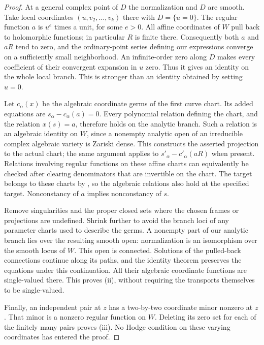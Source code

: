 \begin{proof}
At a general complex point of $D$ the normalization and $D$ are smooth.
Take local coordinates $(u,v_2,\ldots,v_k)$ there with $D=\{u=0\}$.
The regular function $a$ is $u^e$ times a unit, for some $e>0$.
All affine coordinates of $W$ pull back to holomorphic functions; in
particular $R$ is finite there.  Consequently both $a$ and $aR$ tend to
zero, and the ordinary-point series defining our expressions converge
on a sufficiently small neighborhood.  An infinite-order zero along
$D$ makes every coefficient of their convergent expansion in $u$ zero.
Thus it gives an identity on the whole local branch.  This is stronger
than an identity obtained by setting $u=0$.

Let $c_\alpha(x)$ be the algebraic coordinate germs of the first curve
chart.  Its added equations are $s_\alpha-c_\alpha(a)=0$.  Every
polynomial relation defining the chart, and the relation $x(s)=a$,
therefore holds on the analytic branch.  Such a relation is an algebraic
identity on $W$, since a nonempty analytic open of an irreducible complex
algebraic variety is Zariski dense.  This constructs the asserted
projection to the actual chart; the same argument applies to
$s'_\alpha-c'_\alpha(aR)$ when present.  Relations involving regular
functions on these affine charts can equivalently be checked after
clearing denominators that are invertible on the chart.  The target
belongs to these charts by , so the algebraic
relations also hold at the specified target.  Nonconstancy of $a$
implies nonconstancy of $s$.

Remove singularities and the proper closed sets where the chosen frames
or projections are undefined.  Shrink further to avoid the branch loci
of any parameter charts used to describe the germs.  A nonempty part of
our analytic branch lies over the resulting smooth open: normalization
is an isomorphism over the smooth locus of $W$.  This open is connected.
Solutions of the pulled-back connections continue along its paths, and
the identity theorem preserves the equations under this continuation.
All their algebraic coordinate functions are single-valued there.  This
proves (ii), without requiring the transports themselves to be
single-valued.

Finally, an independent pair at $z$ has a two-by-two coordinate minor
nonzero at $z$.  That minor is a nonzero regular function on $W$.
Deleting its zero set for each of the finitely many pairs proves (iii).
No Hodge condition on these varying coordinates has entered the proof.
\end{proof}

